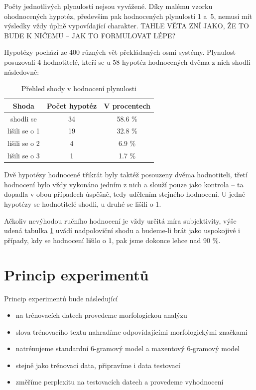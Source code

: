 \documentclass[12pt,a4paper]{report}
\begin{document}
Počty jednotlivých plynulostí nejsou vyvážené. Díky malému vzorku ohodnocených hypotéz, především pak hodnocených plynulostí 1 a~5, nemusí mít výsledky vždy úplně vypovídající charakter. TAHLE VĚTA ZNÍ JAKO, ŽE TO BUDE K NIČEMU -- JAK TO FORMULOVAT LÉPE?

\pagebreak

Hypotézy pochází ze 400 různých vět překládaných osmi systémy. Plynulost posuzovali 4 hodnotitelé, kteří se u 58 hypotéz hodnocených dvěma z nich shodli následovně:

\begin{table}[!htbp]
\begin{center}\begin{tabular}{|c|c|c|}
	\hline
	\textbf{Shoda} & \textbf{Počet hypotéz} & \textbf{V procentech}\\
	\hline
	shodli se & 34 & 58.6 \%\\
	\hline
	lišili se o 1 & 19 & 32.8 \%\\
	\hline
	lišili se o 2 & 4 & 6.9 \%\\
	\hline
	lišili se o 3 & 1 & 1.7 \%\\
	\hline
\end{tabular}
\caption{Přehled shody v hodnocení plynulosti}\label{tb:shoda}
\end{center}\end{table}

Dvě hypotézy hodnocené třikrát byly taktéž posouzeny dvěma hodnotiteli, třetí hodnocení bylo vždy vykonáno jedním z nich a slouží pouze jako kontrola -- ta dopadla v obou případech úspěšně, tedy udělením stejného hodnocení. U jedné hypotézy se hodnotitelé shodli, u druhé se lišili o 1.

Ačkoliv nevýhodou ručního hodnocení je vždy určitá míra subjektivity, výše udená tabulka \ref{tb:shoda} uvádí nadpoloviční shodu a budeme-li brát jako uspokojivé i případy, kdy se hodnocení lišilo o 1, pak jsme dokonce lehce nad 90 \%.

\section{Princip experimentů}

Princip experimentů bude následující
\begin{itemize}
\item{na trénovacích datech provedeme morfologickou analýzu}
\item{slova trénovacího textu nahradíme odpovídajícími morfologickými značkami}
\item{natrénujeme standardní 6-gramový model a maxentový 6-gramový model}
\item{stejně jako trénovací data, připravíme i data testovací}
\item{změříme perplexitu na testovacích datech a provedeme vyhodnocení}
\end{itemize}
\end{document}
